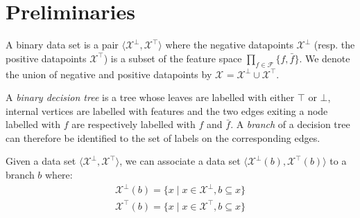 \documentclass{llncs}
\newcommand{\setex}[1]{\ensuremath{{\mathcal X}^{#1}}\xspace}
\newcommand{\posex}{{\setex{\top}}\xspace}
\newcommand{\negex}{{\setex{\bot}}\xspace}
\newcommand{\allex}{{\setex{}}\xspace}
\newcommand{\features}{\ensuremath{{\mathcal F}}\xspace}
\newcommand{\var}{\ensuremath{x}}
\newcommand{\ex}{\ensuremath{\var}}
\newcommand{\afeat}[0]{\ensuremath{f}}
\newcommand{\aclass}[0]{\ensuremath{l}}
\newcommand{\classlabel}[1][]{\ensuremath{\ifthenelse{\equal{#1}{}}{{y}}{{y({{#1}})}}}}
\newcommand{\abranch}[0]{\ensuremath{b}}
\begin{document}

\section{Preliminaries}

A binary data set is a pair $\langle \negex,\posex \rangle$ where the negative datapoints $\negex$ (resp. the positive datapoints $\posex$) is a subset of the feature space $\prod_{\afeat \in \features}\{\afeat,\bar{\afeat}\}$.
We denote the union of negative and positive datapoints by $\allex = \negex \cup \posex$.


A \emph{binary decision tree} is a tree whose leaves are labelled with either $\top$ or $\bot$, internal vertices are labelled with features and the two edges exiting a node labelled with $\afeat$ are respectively labelled with $\afeat$ and $\bar{\afeat}$.
A \emph{branch} of a decision tree can therefore be identified to the set of labels on the corresponding edges.

 
Given a data set $\langle \negex,\posex \rangle$, we can associate a data set $\langle \negex(\abranch),\posex(\abranch) \rangle$ to a branch $\abranch$ where:
\begin{eqnarray*}
\negex(\abranch) = \{\ex \mid \ex \in \negex, \abranch \subseteq \ex\}\\
\posex(\abranch) = \{\ex \mid \ex \in \posex, \abranch \subseteq \ex\}
\end{eqnarray*}
\end{document}
